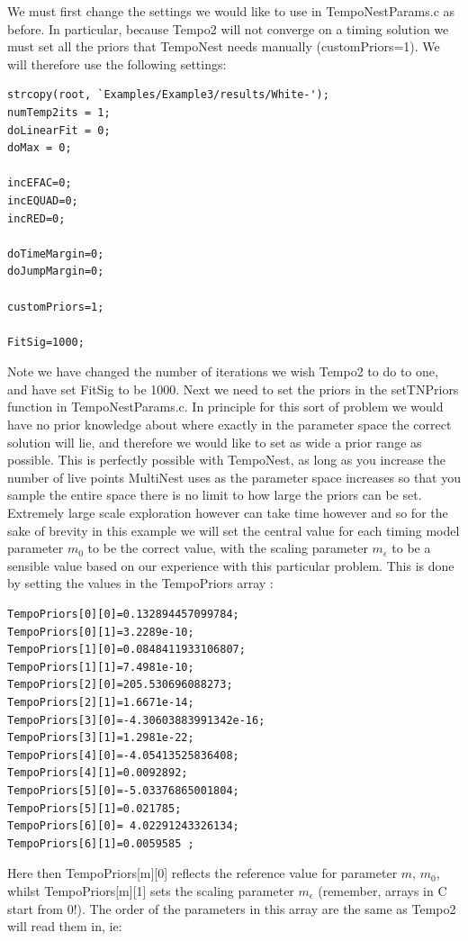\documentclass[%
 preprint,
 amsmath,amssymb,amsfonts,
 aps,
]{revtex4-1}
\begin{document}
We must first change the settings we would like to use in TempoNestParams.c as before.  In particular, because Tempo2 will not converge on a timing solution we must set all the priors that TempoNest needs manually (customPriors=1).  We will therefore use the following settings:

\begin{lstlisting}
strcopy(root, `Examples/Example3/results/White-');
numTemp2its = 1;
doLinearFit = 0;
doMax = 0;

incEFAC=0;
incEQUAD=0;
incRED=0;

doTimeMargin=0;
doJumpMargin=0;

customPriors=1;

FitSig=1000;
\end{lstlisting}

Note we have changed the number of iterations we wish Tempo2 to do to one, and have set FitSig to be 1000.  Next we need to set the priors in the setTNPriors function in TempoNestParams.c.  In principle for this sort of problem we would have no prior knowledge about where exactly in the parameter space the correct solution will lie, and therefore we would like to set as wide a prior range as possible.  This is perfectly possible with TempoNest, as long as you increase the number of live points MultiNest uses as the parameter space increases so that you sample the entire space there is no limit to how large the priors can be set.  Extremely large scale exploration however can take time however and so for the sake of brevity in this example we will set the central value for each timing model parameter $m_0$ to be the correct value, with the scaling parameter $m_{\epsilon}$ to be a sensible value based on our experience with this particular problem.  This is done by setting the values in the TempoPriors array :

\begin{lstlisting}
TempoPriors[0][0]=0.132894457099784;
TempoPriors[0][1]=3.2289e-10;
TempoPriors[1][0]=0.0848411933106807;
TempoPriors[1][1]=7.4981e-10;
TempoPriors[2][0]=205.530696088273;
TempoPriors[2][1]=1.6671e-14;
TempoPriors[3][0]=-4.30603883991342e-16;
TempoPriors[3][1]=1.2981e-22;
TempoPriors[4][0]=-4.05413525836408;
TempoPriors[4][1]=0.0092892;
TempoPriors[5][0]=-5.03376865001804;
TempoPriors[5][1]=0.021785;
TempoPriors[6][0]= 4.02291243326134;
TempoPriors[6][1]=0.0059585 ;
\end{lstlisting}

Here then TempoPriors[m][0] reflects the reference value for parameter $m$, $m_0$, whilst TempoPriors[m][1] sets the scaling parameter $m_{\epsilon}$ (remember, arrays in C start from 0!).
The order of the parameters in this array are the same as Tempo2 will read them in, ie:
\end{document}
